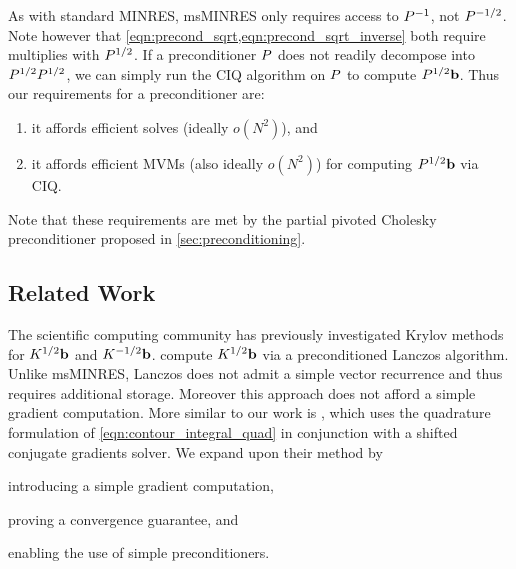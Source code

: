 As with standard MINRES, msMINRES only requires access to $P^{-1}$, not $P^{-1/2}$.
Note however that \cref{eqn:precond_sqrt,eqn:precond_sqrt_inverse} both require multiplies with $P^{1/2}$.
If a preconditioner $P$ does not readily decompose into $P^{1/2} P^{1/2}$, we can simply run the CIQ algorithm on $P$ to compute $P^{1/2} \mathbf{b}$.
Thus our requirements for a preconditioner are:
\begin{enumerate}
	\item it affords efficient solves (ideally $o(N^2)$), and
  \item it affords efficient MVMs (also ideally $o(N^2)$) for computing $P^{1/2} \mathbf{b}$ via CIQ.
\end{enumerate}
%
Note that these requirements are met by the partial pivoted Cholesky preconditioner proposed in \cref{sec:preconditioning}.






\subsection{Related Work}
The scientific computing community has previously investigated Krylov methods for $K^{1/2} \mathbf{b}$ and $K^{-1/2} \mathbf{b}$.
\citet{chow2014preconditioned} compute $K^{1/2} \mathbf{b}$ via a preconditioned Lanczos algorithm.
Unlike msMINRES, Lanczos does not admit a simple vector recurrence and thus requires additional storage.
Moreover this approach does not afford a simple gradient computation.
More similar to our work is \cite{aune2013iterative,aune2014parameter}, which uses the quadrature formulation of \cref{eqn:contour_integral_quad} in conjunction with a shifted conjugate gradients solver.
We expand upon their method by
\begin{enumerate*}
  \item introducing a simple gradient computation,
  \item proving a convergence guarantee, and
  \item enabling the use of simple preconditioners.
\end{enumerate*}
